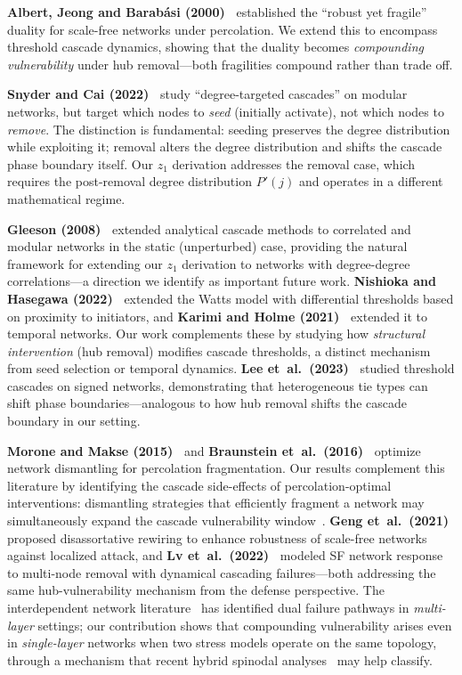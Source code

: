 \documentclass[aps,pre,twocolumn,superscriptaddress,showpacs]{revtex4-2}
\begin{document}
\textbf{Albert, Jeong and Barab\'asi (2000)~\cite{Albert2000}} established the ``robust yet fragile'' duality for scale-free networks under percolation. We extend this to encompass threshold cascade dynamics, showing that the duality becomes \emph{compounding vulnerability} under hub removal---both fragilities compound rather than trade off.

\textbf{Snyder and Cai (2022)~\cite{SnyderCai2022}} study ``degree-targeted cascades'' on modular networks, but target which nodes to \emph{seed} (initially activate), not which nodes to \emph{remove}. The distinction is fundamental: seeding preserves the degree distribution while exploiting it; removal alters the degree distribution and shifts the cascade phase boundary itself. Our $z_1$ derivation addresses the removal case, which requires the post-removal degree distribution $P'(j)$ and operates in a different mathematical regime.

\textbf{Gleeson (2008)~\cite{Gleeson2008}} extended analytical cascade methods to correlated and modular networks in the static (unperturbed) case, providing the natural framework for extending our $z_1$ derivation to networks with degree-degree correlations---a direction we identify as important future work. \textbf{Nishioka and Hasegawa (2022)~\cite{Nishioka2022}} extended the Watts model with differential thresholds based on proximity to initiators, and \textbf{Karimi and Holme (2021)~\cite{Karimi2021}} extended it to temporal networks. Our work complements these by studying how \emph{structural intervention} (hub removal) modifies cascade thresholds, a distinct mechanism from seed selection or temporal dynamics. \textbf{Lee et~al.\ (2023)~\cite{Lee2023}} studied threshold cascades on signed networks, demonstrating that heterogeneous tie types can shift phase boundaries---analogous to how hub removal shifts the cascade boundary in our setting.

\textbf{Morone and Makse (2015)~\cite{Morone2015}} and \textbf{Braunstein et~al.\ (2016)~\cite{Braunstein2016}} optimize network dismantling for percolation fragmentation. Our results complement this literature by identifying the cascade side-effects of percolation-optimal interventions: dismantling strategies that efficiently fragment a network may simultaneously expand the cascade vulnerability window~\cite{Artime2024}. \textbf{Geng et~al.\ (2021)~\cite{Geng2021}} proposed disassortative rewiring to enhance robustness of scale-free networks against localized attack, and \textbf{Lv et~al.\ (2022)~\cite{Lv2022}} modeled SF network response to multi-node removal with dynamical cascading failures---both addressing the same hub-vulnerability mechanism from the defense perspective. The interdependent network literature~\cite{Xu2021,Brummitt2012} has identified dual failure pathways in \emph{multi-layer} settings; our contribution shows that compounding vulnerability arises even in \emph{single-layer} networks when two stress models operate on the same topology, through a mechanism that recent hybrid spinodal analyses~\cite{Bonamassa2024,Pal2023} may help classify.
\end{document}
